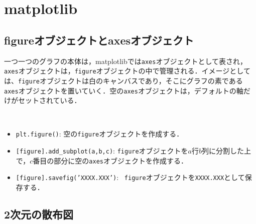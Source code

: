 \section{matplotlib}

\subsection{figureオブジェクトとaxesオブジェクト}
一つ一つのグラフの本体は，matplotlibでは\texttt{axes}オブジェクトとして表され，\texttt{axes}オブジェクトは，\texttt{figure}オブジェクトの中で管理される．イメージとしては、\texttt{figure}オブジェクトは白のキャンバスであり，そこにグラフの素である\texttt{axes}オブジェクトを置いていく．空の\texttt{axes}オブジェクトは，デフォルトの軸だけがセットされている．

\begin{gram}　
\begin{itemize}
\item \texttt{plt.figure()}: 空の\texttt{figure}オブジェクトを作成する．
\item \texttt{[figure].add\_subplot(a,b,c)}: \texttt{figure}オブジェクトを$a$行$b$列に分割した上で，$c$番目の部分に空の\texttt{axes}オブジェクトを作成する．
\item \texttt{[figure].savefig('XXXX.XXX')}: ~\texttt{figure}オブジェクトを\texttt{XXXX.XXX}として保存する．
\end{itemize}
\end{gram}

\begin{cod}[\texttt{fig1.py}]　
}]{code/fig1.py}
\vspace{-19pt}
\begin{figure}[H]
\begin{center}
\framed
\texttt{[image: code/fig1.eps]}
\endframed
\end{center}
\end{figure}
\end{cod}
\vspace{-20pt}

\subsection{2次元の散布図}

